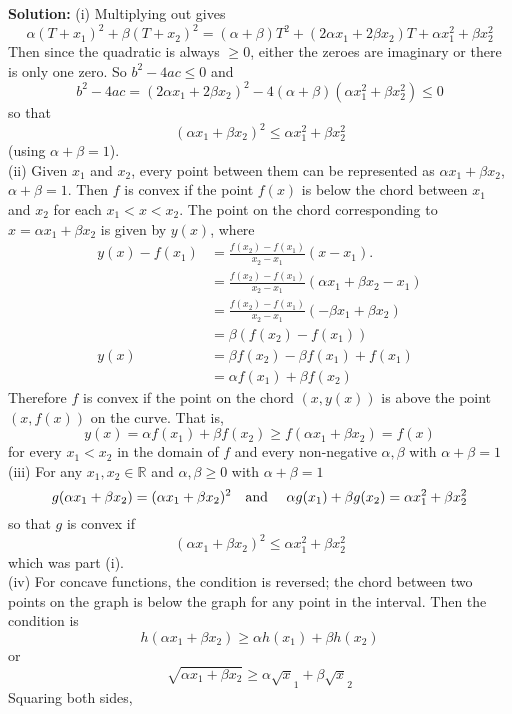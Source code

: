 \documentclass{article}
\newcommand{\solution}[1]{\setlength{\hangindent}{\parindent} \indent\indent \textbf{Solution: }#1\hfill\break}
\begin{document}
\solution{(i) Multiplying out gives
$$\alpha(T + x_1)^2 + \beta(T + x_2)^2= (\alpha + \beta)T^2 + (2\alpha x_1 + 2\beta x_2) T + \alpha x_1^2 + \beta x_2^2$$  
Then since the quadratic is always $\geqslant 0$, either the zeroes are imaginary or there is only one zero. So $b^2-4ac\leqslant 0$ and  
$$b^2-4ac = (2\alpha x_1 + 2\beta x_2)^2 - 4(\alpha + \beta)(\alpha x_1^2 + \beta x_2^2) \leq 0 $$
so that 
$$(\alpha x_1 + \beta x_2)^2 \leqslant \alpha x_1^2 + \beta x_2^2$$ 
(using $\alpha + \beta = 1$). \\%
\indent(ii) Given $x_1$ and $x_2$, every point between them can be represented as $\alpha x_1 + \beta x_2$, $\alpha + \beta = 1$. Then $f$ is convex if the point $f(x)$ is below the chord between $x_1$ and $x_2$ for each $x_1<x<x_2$. The point on the chord corresponding to $x = \alpha x_1 + \beta x_2$ is given by $y(x)$, where
\begin{align*}
y(x) - f(x_1) &= \tfrac{f(x_2)-f(x_1)}{x_2-x_1} (x-x_1). \\
&= \tfrac{f(x_2) - f(x_1)}{x_2-x_1} (\alpha x_1 + \beta x_2 - x_1) \\
&= \tfrac{f(x_2) - f(x_1)}{x_2-x_1} (-\beta x_1 + \beta x_2) \\
&= \beta(f(x_2) - f(x_1)) \\
y(x) &= \beta f(x_2) - \beta f(x_1) + f(x_1) \\
&= \alpha f(x_1) + \beta f(x_2)
\end{align*}
Therefore $f$ is convex if the point on the chord $(x, y(x))$ is above the point $(x, f(x))$ on the curve. That is,
$$y(x) = \alpha f(x_1) + \beta f(x_2) \geqslant f(\alpha x_1 + \beta x_2) = f(x)$$
for every $x_1<x_2$ in the domain of $f$ and every non-negative $\alpha, \beta$ with $\alpha + \beta = 1$ \\
\indent (iii) For any $x_1, x_2\in\mathbb{R}$ and $\alpha, \beta \geqslant 0$ with $\alpha + \beta =1$  
$$g(\alpha x_1 + \beta x_2) = (\alpha x_1 + \beta x_2)^2 \text{\quad and \quad} \alpha g(x_1) + \beta g(x_2) = \alpha x_1^2 + \beta x_2^2$$
so that $g$ is convex if 
$$(\alpha x_1 + \beta x_2)^2 \leqslant \alpha x_1^2 + \beta x_2^2$$
which was part (i). \\
\indent (iv) For concave functions, the condition is reversed; the chord between two points on the graph is below the graph for any point in the interval. Then the condition is 
$$h(\alpha x_1 + \beta x_2) \geqslant \alpha h(x_1) + \beta h(x_2)$$
or  
$$\sqrt{\alpha x_1 + \beta x_2}  \geqslant \alpha\sqrt x_1 + \beta\sqrt x_2$$
Squaring both sides,
\begin{align*} 

\end{align*}}
\end{document}
